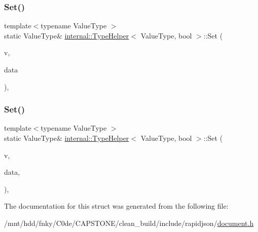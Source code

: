 \mbox{\label{structinternal_1_1TypeHelper_3_01ValueType_00_01bool_01_4_a4bfa644e57e7d725468ed78103c1579a}} 
\subsubsection{\texorpdfstring{Set()}{Set()}\hspace{0.1cm}{\footnotesize\ttfamily [1/2]}}
{\footnotesize\ttfamily template$<$typename Value\+Type $>$ \\
static Value\+Type\& \hyperlink{structinternal_1_1TypeHelper}{internal\+::\+Type\+Helper}$<$ Value\+Type, bool $>$\+::Set (\begin{DoxyParamCaption}\item[{Value\+Type \&}]{v,  }\item[{bool}]{data }\end{DoxyParamCaption})\hspace{0.3cm}{\ttfamily [inline]}, {\ttfamily [static]}}

\mbox{\label{structinternal_1_1TypeHelper_3_01ValueType_00_01bool_01_4_a01a2bdf4117fb767c8d703be9e0f5f1d}} 
\subsubsection{\texorpdfstring{Set()}{Set()}\hspace{0.1cm}{\footnotesize\ttfamily [2/2]}}
{\footnotesize\ttfamily template$<$typename Value\+Type $>$ \\
static Value\+Type\& \hyperlink{structinternal_1_1TypeHelper}{internal\+::\+Type\+Helper}$<$ Value\+Type, bool $>$\+::Set (\begin{DoxyParamCaption}\item[{Value\+Type \&}]{v,  }\item[{bool}]{data,  }\item[{typename Value\+Type\+::\+Allocator\+Type \&}]{ }\end{DoxyParamCaption})\hspace{0.3cm}{\ttfamily [inline]}, {\ttfamily [static]}}



The documentation for this struct was generated from the following file\+:\begin{DoxyCompactItemize}
\item 
/mnt/hdd/fnky/\+C0de/\+C\+A\+P\+S\+T\+O\+N\+E/clean\+\_\+build/include/rapidjson/\hyperlink{document_8h}{document.\+h}\end{DoxyCompactItemize}
